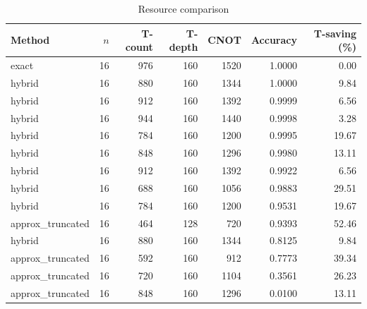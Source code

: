 \begin{table}[ht]
\centering
\small
\begin{tabular}{lrrrrrr}
\toprule
Method & $n$ & T-count & T-depth & CNOT & Accuracy & T-saving (\%) \\
\midrule
exact & 16 & 976 & 160 & 1520 & 1.0000 & 0.00 \\
\midrule
hybrid & 16 & 880 & 160 & 1344 & 1.0000 & 9.84 \\
hybrid & 16 & 912 & 160 & 1392 & 0.9999 & 6.56 \\
hybrid & 16 & 944 & 160 & 1440 & 0.9998 & 3.28 \\
hybrid & 16 & 784 & 160 & 1200 & 0.9995 & 19.67 \\
hybrid & 16 & 848 & 160 & 1296 & 0.9980 & 13.11 \\
hybrid & 16 & 912 & 160 & 1392 & 0.9922 & 6.56 \\
hybrid & 16 & 688 & 160 & 1056 & 0.9883 & 29.51 \\
hybrid & 16 & 784 & 160 & 1200 & 0.9531 & 19.67 \\
\midrule
approx_truncated & 16 & 464 & 128 & 720 & 0.9393 & 52.46 \\
\midrule
hybrid & 16 & 880 & 160 & 1344 & 0.8125 & 9.84 \\
\midrule
approx_truncated & 16 & 592 & 160 & 912 & 0.7773 & 39.34 \\
approx_truncated & 16 & 720 & 160 & 1104 & 0.3561 & 26.23 \\
approx_truncated & 16 & 848 & 160 & 1296 & 0.0100 & 13.11 \\
\bottomrule
\end{tabular}
\caption{Resource comparison}
\label{tab:resource_comparison}
\end{table}